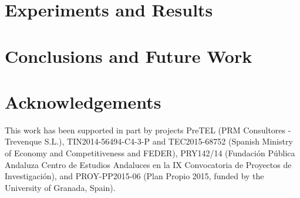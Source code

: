 \documentclass[a4paper,10pt,onecolumn,preprint,3p]{elsarticle}
\begin{document}
\section{Experiments and Results}
\label{sec:experiments_results}


\section{Conclusions and Future Work}
\label{sec:conclusions}





\section*{Acknowledgements}

This work has been supported in part by projects PreTEL (PRM Consultores - Trevenque S.L.), TIN2014-56494-C4-3-P and TEC2015-68752 (Spanish Ministry of Economy and Competitiveness and FEDER), PRY142/14 (Fundaci{\'o}n P{\'u}blica Andaluza Centro de Estudios Andaluces en la IX Convocatoria de Proyectos de Investigaci{\'o}n), and PROY-PP2015-06 (Plan Propio 2015, funded by the University of Granada, Spain).





\end{document}
